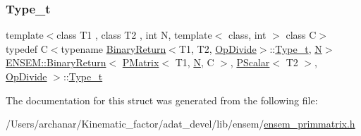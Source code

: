 \subsubsection{\texorpdfstring{Type\_t}{Type\_t}\hspace{0.1cm}{\footnotesize\ttfamily [2/2]}}
{\footnotesize\ttfamily template$<$class T1 , class T2 , int N, template$<$ class, int $>$ class C$>$ \\
typedef C$<$typename \mbox{\hyperlink{structENSEM_1_1BinaryReturn}{Binary\+Return}}$<$T1, T2, \mbox{\hyperlink{structENSEM_1_1OpDivide}{Op\+Divide}}$>$\+::\mbox{\hyperlink{structENSEM_1_1BinaryReturn_3_01PMatrix_3_01T1_00_01N_00_01C_01_4_00_01PScalar_3_01T2_01_4_00_01OpDivide_01_4_ac9773cff5366cd64bdc3213b4d2a2060}{Type\+\_\+t}}, \mbox{\hyperlink{operator__name__util_8cc_a7722c8ecbb62d99aee7ce68b1752f337}{N}}$>$ \mbox{\hyperlink{structENSEM_1_1BinaryReturn}{E\+N\+S\+E\+M\+::\+Binary\+Return}}$<$ \mbox{\hyperlink{classENSEM_1_1PMatrix}{P\+Matrix}}$<$ T1, \mbox{\hyperlink{operator__name__util_8cc_a7722c8ecbb62d99aee7ce68b1752f337}{N}}, C $>$, \mbox{\hyperlink{classENSEM_1_1PScalar}{P\+Scalar}}$<$ T2 $>$, \mbox{\hyperlink{structENSEM_1_1OpDivide}{Op\+Divide}} $>$\+::\mbox{\hyperlink{structENSEM_1_1BinaryReturn_3_01PMatrix_3_01T1_00_01N_00_01C_01_4_00_01PScalar_3_01T2_01_4_00_01OpDivide_01_4_ac9773cff5366cd64bdc3213b4d2a2060}{Type\+\_\+t}}}



The documentation for this struct was generated from the following file\+:\begin{DoxyCompactItemize}
\item 
/\+Users/archanar/\+Kinematic\+\_\+factor/adat\+\_\+devel/lib/ensem/\mbox{\hyperlink{lib_2ensem_2ensem__primmatrix_8h}{ensem\+\_\+primmatrix.\+h}}\end{DoxyCompactItemize}
